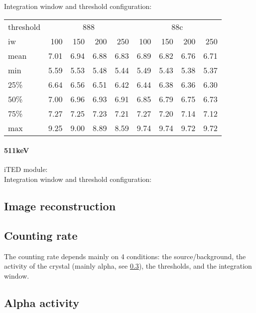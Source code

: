 Integration window and threshold configuration:\\

\begin{tabular}{lrrrrrrrr}
    \toprule
    threshold & \multicolumn{4}{c}{888} & \multicolumn{4}{c}{88c} \\
    iw &  100 &  150 &  200 &  250 &  100 &  150 &  200 &  250 \\
    \midrule
    mean & 7.01 & 6.94 & 6.88 & 6.83 & 6.89 & 6.82 & 6.76 & 6.71 \\
    min  & 5.59 & 5.53 & 5.48 & 5.44 & 5.49 & 5.43 & 5.38 & 5.37 \\
    25\%  & 6.64 & 6.56 & 6.51 & 6.42 & 6.44 & 6.38 & 6.36 & 6.30 \\
    50\%  & 7.00 & 6.96 & 6.93 & 6.91 & 6.85 & 6.79 & 6.75 & 6.73 \\
    75\%  & 7.27 & 7.25 & 7.23 & 7.21 & 7.27 & 7.20 & 7.14 & 7.12 \\
    max  & 9.25 & 9.00 & 8.89 & 8.59 & 9.74 & 9.74 & 9.72 & 9.72 \\
    \bottomrule
\end{tabular}

\paragraph*{511keV}

iTED module:\\

Integration window and threshold configuration:\\

\subsection{Image reconstruction}

\subsection{Counting rate}

The counting rate depends mainly on 4 conditions: the source/background, the activity of the crystal (mainly alpha, see \ref{ssec:alpha}), the thresholds, and the integration window.

\subsection{Alpha activity}\label{ssec:alpha}

